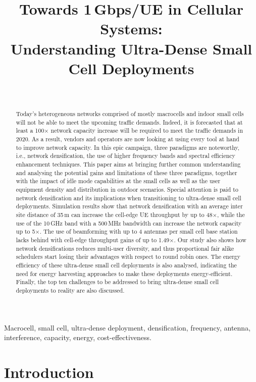 \documentclass{IEEEtran}
\title{Towards 1\,Gbps/UE in Cellular Systems: \\ Understanding Ultra-Dense Small Cell Deployments}
\author{
\IEEEauthorblockN{David L\'opez-P\'erez$^1$, Ming Ding$^2$, Holger Claussen$^1$, and Amir H. Jafari$^1$$^3$}\\
\IEEEauthorblockA{\textit{ $^1$ Bell Laboratories, Alcatel-Lucent, Republic of Ireland}\\
\textit{$^2$ National ICT Australia (NICTA), Australia}\\
\textit{$^3$ University of Sheffield, United Kingdom}}
}
\begin{document}
\maketitle
\begin{abstract}
Today's heterogeneous networks comprised of mostly macrocells and indoor small cells
will not be able to meet the upcoming traffic demands.
Indeed, it is forecasted that at least a 100$\times$ network capacity increase will be required to meet the traffic demands in 2020.
As a result,
vendors and operators are now looking at using every tool at hand to improve network capacity.
In this epic campaign, three paradigms are noteworthy,
i.e., network densification, the use of higher frequency bands and spectral efficiency enhancement techniques.
This paper aims at bringing further common understanding
and analysing the potential gains and limitations of these three paradigms,
together with the impact of
idle mode capabilities at the small cells as well as the user equipment density and distribution in outdoor scenarios.
Special attention is paid to network densification and its implications when transitioning to ultra-dense small cell deployments.
Simulation results show that network densification with an average inter site distance of 35\,m can increase the cell-edge UE throughput by up to 48$\times$,
while the use of the 10\,GHz band with a 500\,MHz bandwidth can increase the network capacity up to 5$\times$.
The use of beamforming with up to 4 antennas per small cell base station lacks behind with cell-edge throughput gains of up to 1.49$\times$.
Our study also shows how network densifications reduces multi-user diversity,
and thus proportional fair alike schedulers start losing their advantages with respect to round robin ones.
The energy efficiency of these ultra-dense small cell deployments is also analysed,
indicating the need for energy harvesting approaches to make these deployments energy-efficient.
Finally, the top ten challenges to be addressed to bring ultra-dense small cell deployments to reality are also discussed.


\end{abstract}
\begin{IEEEkeywords}
Macrocell, small cell, ultra-dense deployment, densification, frequency, antenna, interference, capacity, energy, cost-effectiveness.
\end{IEEEkeywords}
\section{Introduction}
\label{introduction}
\end{document}
